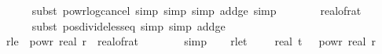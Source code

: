 \begin{isabellebody}
\ \ \ \ \isamarkupfalse%
\ {\isacharparenleft}{\kern0pt}subst\ powr{\isacharunderscore}{\kern0pt}log{\isacharunderscore}{\kern0pt}cancel{\isacharcomma}{\kern0pt}\ simp{\isacharcomma}{\kern0pt}\ simp{\isacharcomma}{\kern0pt}\ simp\ add{\isacharcolon}{\kern0pt}{\isasymdelta}{\isacharunderscore}{\kern0pt}ge{\isacharunderscore}{\kern0pt}{}{\isacharcomma}{\kern0pt}\ simp{\isacharparenright}{\kern0pt}\isanewline
\ \ \isamarkupfalse%
\ \isamarkupfalse%
\ {\isachardoublequoteopen}{\isachardot}{\kern0pt}{\isachardot}{\kern0pt}{\isachardot}{\kern0pt}\ {\isacharless}{\kern0pt}\ real{\isacharunderscore}{\kern0pt}of{\isacharunderscore}{\kern0pt}rat\ {\isasymdelta}\ {\isacharslash}{\kern0pt}\ {}{\isachardoublequoteclose}\isanewline
\ \ \ \ \isamarkupfalse%
\ {\isacharparenleft}{\kern0pt}subst\ pos{\isacharunderscore}{\kern0pt}divide{\isacharunderscore}{\kern0pt}less{\isacharunderscore}{\kern0pt}eq{\isacharcomma}{\kern0pt}\ simp{\isacharcomma}{\kern0pt}\ simp\ add{\isacharcolon}{\kern0pt}{\isasymdelta}{\isacharunderscore}{\kern0pt}ge{\isacharunderscore}{\kern0pt}{}{\isacharparenright}{\kern0pt}\isanewline
\ \ \isamarkupfalse%
\ \isamarkupfalse%
\ r{\isacharunderscore}{\kern0pt}le{\isacharunderscore}{\kern0pt}{\isasymdelta}{\isacharcolon}{\kern0pt}\ {\isachardoublequoteopen}{}\ powr\ {\isacharparenleft}{\kern0pt}{\isacharminus}{\kern0pt}real\ r{\isacharparenright}{\kern0pt}\ {\isacharless}{\kern0pt}\ {\isacharparenleft}{\kern0pt}real{\isacharunderscore}{\kern0pt}of{\isacharunderscore}{\kern0pt}rat\ {\isasymdelta}{\isacharparenright}{\kern0pt}{\isacharslash}{\kern0pt}\ {}{\isachardoublequoteclose}\isanewline
\ \ \ \ \isamarkupfalse%
\ simp\isanewline
\isanewline
\ \ \isamarkupfalse%
\ r{\isacharunderscore}{\kern0pt}le{\isacharunderscore}{\kern0pt}t{}{\isacharcolon}{\kern0pt}\ {\isachardoublequoteopen}{}{}\ {\isacharasterisk}{\kern0pt}\ {}{}\ {\isacharasterisk}{\kern0pt}\ {\isacharparenleft}{\kern0pt}real\ t{\isacharparenright}{\kern0pt}\ {\isacharasterisk}{\kern0pt}\ {}\ powr\ {\isacharparenleft}{\kern0pt}{\isacharminus}{\kern0pt}real\ r{\isacharparenright}{\kern0pt}\ {\isasymle}\ \isanewline

\end{isabellebody}
